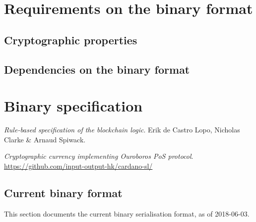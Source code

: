 \documentclass{article}
\begin{document}
\section{Requirements on the binary format}
\label{sec:reqs}

\subsection{Cryptographic properties}

\subsection{Dependencies on the binary format}

\section{Binary specification}
\label{sec:binfmt}

\begin{thebibliography}{9}
  \textit{Rule-based specification of the blockchain logic}.
  Erik de Castro Lopo, Nicholas Clarke \& Arnaud Spiwack.

  \textit{Cryptographic currency implementing Ouroboros PoS protocol}.
  \url{https://github.com/input-output-hk/cardano-sl/}

\end{thebibliography}

\begin{appendices}
  \section{Current binary format}
  \label{sec:currentfmt}

  This section documents the current binary serialisation format, as of
  2018-06-03.
\end{appendices}
\end{document}
